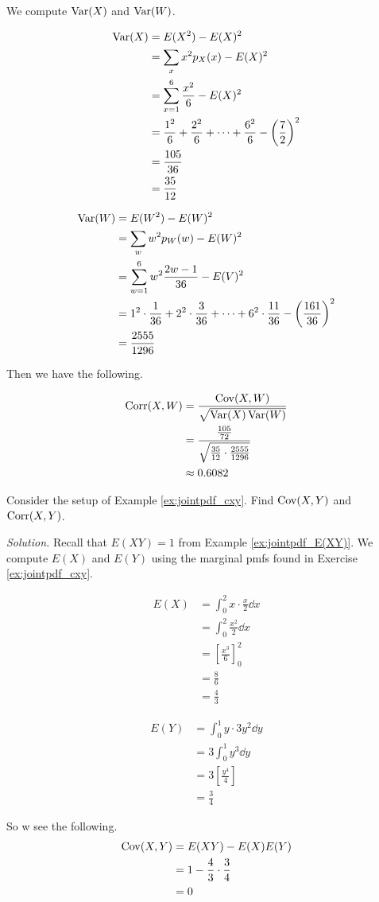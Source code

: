 \begin{example}[]
	We compute $\operatorname{Var}(X)$ and $\operatorname{Var}(W)$.

	\begin{align*}
		\operatorname{Var}(X)&=E(X^2)-E(X)^2\\
		&=\sum_xx^2p_X(x)-E(X)^2\\
		&=\sum_{x=1}^6\frac{x^2}{6}-E(X)^2\\
		&=\frac{1^2}{6}+\frac{2^2}{6}+\cdots+\frac{6^2}{6}-\left(\frac 72\right)^2\\
		&=\frac{105}{36}\\
		&=\frac{35}{12}
	\end{align*}

	\begin{align*}
		\operatorname{Var}(W)&=E(W^2)-E(W)^2\\
		&=\sum_ww^2p_W(w)-E(W)^2\\
		&=\sum_{w=1}^6w^2\frac{2w-1}{36}-E(V)^2\\
		&=1^2\cdot\frac{1}{36}+2^2\cdot\frac{3}{36}+\cdots+6^2\cdot\frac{11}{36}-\left(\frac{161}{36}\right)^2\\
		&=\frac{2555}{1296}
	\end{align*}

	Then we have the following.

	\begin{align*}
		\operatorname{Corr}(X,W)&=\frac{\operatorname{Cov}(X,W)}{\sqrt{\operatorname{Var}(X)\operatorname{Var}(W)}}\\
		&=\frac{\frac{105}{72}}{\sqrt{\frac{35}{12}\cdot\frac{2555}{1296}}}\\
		&\approx 0.6082
	\end{align*}
\end{example}

\begin{example}[]
	Consider the setup of Example \ref{ex:jointpdf_cxy}. Find $\operatorname{Cov}(X,Y)$ and $\operatorname{Corr}(X,Y)$.

	\textit{Solution.} Recall that $E(XY)=1$ from Example \ref{ex:jointpdf_E(XY)}. We compute $E(X)$ and $E(Y)$ using the marginal pmfs found in Exercise \ref{ex:jointpdf_cxy}.

	\begin{align*}
		E(X)&=\int_0^2x\cdot\frac x2\dd x\\
		&=\int_0^2\frac{x^2}{2}\dd x\\
		&=\left[\frac{x^3}6\right]_0^2\\
		&=\frac{8}{6}\\
		&=\frac{4}{3}
	\end{align*}

	\begin{align*}
		E(Y)&=\int_0^1y\cdot3y^2\dd y\\
		&=3\int_0^1y^3\dd y\\
		&=3\left[\frac{y^4}{4}\right]\\
		&=\frac{3}{4}
	\end{align*}

	So w see the following.
	\begin{align*}
		\operatorname{Cov}(X,Y)&=E(XY)-E(X)E(Y)\\
		&=1-\frac{4}{3}\cdot\frac{3}{4}\\
		&=0
	\end{align*}
\end{example}

